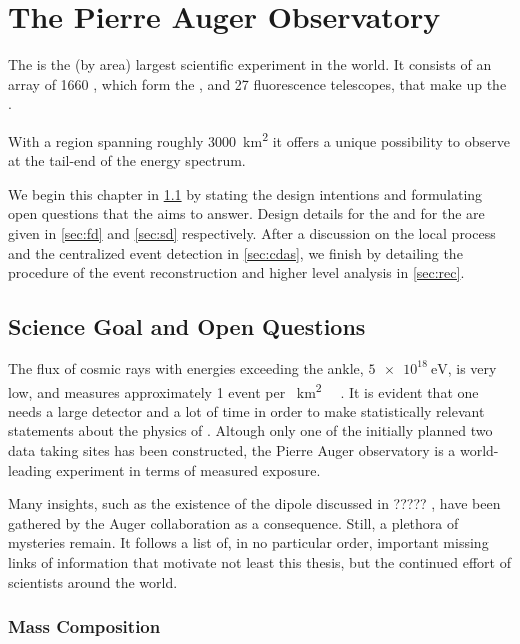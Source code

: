 
\chapter{The Pierre Auger Observatory}
\label{chap:pierre-auger-observatory}

The \PAO is the (by area) largest scientific experiment in the world. It 
consists of an array of 1660 \WCDs, which form the \SD, and 27 fluorescence 
telescopes, that make up the \FD.

With a region spanning roughly \SI{3000}{\kilo\meter\squared} it offers a unique
possibility to observe \UHECRs at the tail-end of the \CR energy spectrum. 

We begin this chapter in \cref{sec:science-case} by stating the design 
intentions and formulating open questions that the \PAO aims to answer. Design
details for the \FD and for the \SD are given in \cref{sec:fd} and \cref{sec:sd} 
respectively. After a discussion on the local \DAQ process and the centralized 
event detection in \cref{sec:cdas}, we finish by detailing the procedure of the
event reconstruction and higher level analysis in \cref{sec:rec}.

\section{Science Goal and Open Questions}
\label{sec:science-case}

The flux of cosmic rays with energies exceeding the ankle, $\SI{5e18}{\eV}$, is 
very low, and measures approximately 1 event per \SI{}{\km\squared\sr\year}
\cite{Fenu2023}. It is evident that one needs a large detector and a lot of time
in order to make statistically relevant statements about the physics of \UHECRs.
Altough only one of the initially planned two data taking sites 
\cite[for white paper see][]{Zavrtanik2000} has been constructed, the Pierre
Auger observatory is a world-leading experiment in terms of measured exposure.

Many insights, such as the existence of the \CR dipole discussed in ?????
, 
have been gathered by the Auger collaboration as a consequence.
Still, a plethora of mysteries remain. It follows a list of, in no particular
order, important missing links of information that motivate not least this
thesis, but the continued effort of scientists around the world.

\subsection{Mass Composition}

